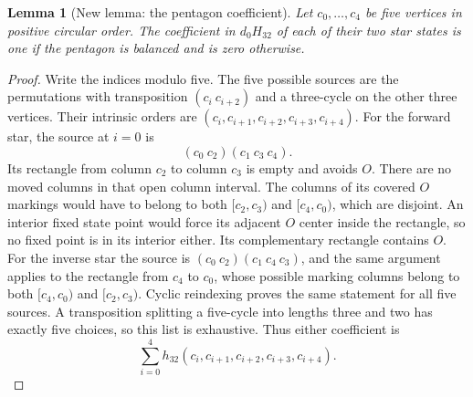 \documentclass[11pt,oneside]{report}
\newtheorem{lemma}[theorem]{Lemma}
\theoremstyle{definition}
\numberwithin{equation}{section}
\begin{document}
\begin{lemma}[New lemma: the pentagon coefficient]\label{J21:lem:m6-pentagon}
Let $c_0,\ldots,c_4$ be five vertices in positive circular order.
The coefficient in $d_0H_{32}$ of each of their two star states is
one if the pentagon is balanced and is zero otherwise.
\end{lemma}
\begin{proof}
Write the indices modulo five. The five possible sources are the
permutations with transposition $(c_i\ c_{i+2})$ and a three-cycle
on the other three vertices. Their intrinsic orders are
$(c_i,c_{i+1},c_{i+2},c_{i+3},c_{i+4})$.
For the forward star, the source at $i=0$ is
\[
 (c_0\ c_2)(c_1\ c_3\ c_4).
\]
Its rectangle from column $c_2$ to column $c_3$ is empty and avoids
$O$. There are no moved columns in that open column interval.
The columns of its covered $O$ markings would have to belong to
both $[c_2,c_3)$ and $[c_4,c_0)$, which are disjoint.
An interior fixed state point would force its adjacent $O$ center
inside the rectangle, so no fixed point is in its interior either.
Its complementary rectangle contains $O$.
For the inverse star the source is
$(c_0\ c_2)(c_1\ c_4\ c_3)$, and the same argument applies to
the rectangle from $c_4$ to $c_0$, whose possible marking columns
belong to both $[c_4,c_0)$ and $[c_2,c_3)$.
Cyclic reindexing proves the same statement for all five sources.
A transposition splitting a five-cycle into lengths three and two
has exactly five choices, so this list is exhaustive.
Thus either coefficient is
\[
 \sum_{i=0}^4h_{32}(c_i,c_{i+1},c_{i+2},c_{i+3},c_{i+4}).
 \tag{M6.12}
\]


\end{proof}
\end{document}
